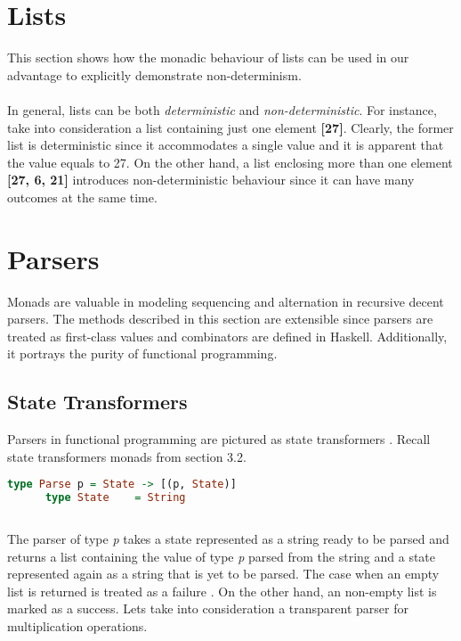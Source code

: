 \documentclass[a4paper, onecolumn]{article}
\begin{document}
    \section{Lists}
    This section shows how the monadic behaviour of lists can be used in our advantage to explicitly demonstrate non-determinism. \\ \\
    In general, lists can be both \textit{deterministic} and \textit{non-deterministic}. For instance, take into consideration a list containing just one element \textbf{[27]}. Clearly, the former list is deterministic since it accommodates a single value and it is apparent that the value equals to 27. On the other hand, a list enclosing more than one element \textbf{[27, 6, 21]} introduces non-deterministic behaviour since it can have many outcomes at the same time. \\ 
    
    \section{Parsers}
    Monads are valuable in modeling sequencing and alternation in recursive decent parsers. The methods described in this section are extensible since parsers are treated as first-class values and combinators are defined in Haskell. Additionally, it portrays the purity of functional programming.
    
    \subsection{State Transformers}
    
    Parsers in functional programming are pictured as state transformers \cite{original}. Recall state transformers monads from section 3.2.  
    
    \begin{tcolorbox}
      \begin{lstlisting}[language=Haskell]
      type Parse p = State -> [(p, State)]
      type State    = String  
      
      \end{lstlisting}
    \end{tcolorbox}
    
    The parser of type \textit{p} takes a state represented as a string ready to be parsed and returns a list containing the value of type \textit{p} parsed from the string and a state represented again as a string that is yet to be parsed. The case when an empty list is returned is treated as a failure \cite{pearls}. On the other hand, an non-empty list is marked as a success. Lets take into consideration a transparent parser for multiplication operations.
    
\end{document}
